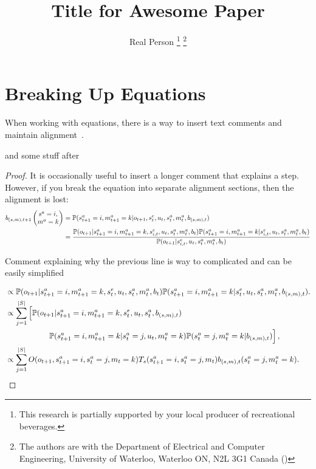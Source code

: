 \documentclass{article}
\title{\LARGE \bf
Title for Awesome Paper}
\author{Real Person
\thanks{This research is partially supported by your local producer of recreational beverages. }
\thanks{The authors are with the Department of Electrical and Computer Engineering, University of Waterloo, Waterloo ON, N2L 3G1 Canada (\real)
    }
}
\begin{document}
\newpage

\section{Breaking Up Equations}

When working with equations, there is a way to insert text comments and maintain alignment~\cite{wang2023cooperative}. 

and some stuff after

\begin{proof}

It is occasionally useful to insert a longer comment that explains a step.  However, if you break the equation into separate alignment sections, then the alignment is lost:
 \begin{align}
    b_{(s,m),t+1}\left(\begin{matrix}
        s^a = i, \\ m^a = k
    \end{matrix} \right) &= \mathbb{P}( s_{t+1}^a = i, m_{t+1}^a = k | o_{t+1}, s_{t}^e, u_{t}, s_t^a, m_t^a, b_{(s,m),t} ) \\
    &= \frac{\mathbb{P}( o_{t+1} | s_{t+1}^a = i, m_{t+1}^a = k, s_{i,t}^e, u_{t},  s_t^a, m_t^a, b_{t} ) \mathbb{P}( s_{t+1}^a = i, m_{t+1}^a = k |  s_{i,t}^e, u_{t},  s_t^a, m_t^a, b_{t} )}{\mathbb{P}(o_{t+1} | s_{i,t}^e, u_{t}, s_t^a, m_t^a, b_{t}   ) } \\     
 \end{align}

Comment explaining why the previous line is way to complicated and can be easily simplified

\begin{align}
     &\propto \mathbb{P}( o_{t+1} |  s_{t+1}^a = i, m_{t+1}^a = k, s_t^e, u_{t}, s_t^a, m_t^a, b_{t} ) \mathbb{P}( s_{t+1}^a = i, m_{t+1}^a = k |  s_t^e, u_{t}, s_{t}^a, m_{t}^a, b_{(s,m),t} ).  \\
    &\propto \sum_{j=1}^{|S|} \left[ \mathbb{P}( o_{t+1} |  s_{t+1}^a = i, m_{t+1}^a = k, s_t^e, u_{t}, s_t^a, b_{(s,m),t} ) \right. \nonumber \\ 
    &~~~~~~~~~~~~~~~~\left. \mathbb{P}( s_{t+1}^a = i, m_{t+1}^a = k | s_{t}^a=j, u_{t}, m_t^a = k ) \mathbb{P}( s_{t}^a = j, m_{t}^a = k |  b_{(s,m),t} ) \right],   \\
    &\propto  \sum_{j=1}^{|S|} O(o_{t+1},s_{t+1}^a=i,s_t^a=j,m_t=k) T_s(s_{t+1}^a=i, s_{t}^a=j, m_t ) b_{(s,m),t}(s_t^a = j, m_{t}^a = k).
\end{align}



\end{proof}
\end{document}
